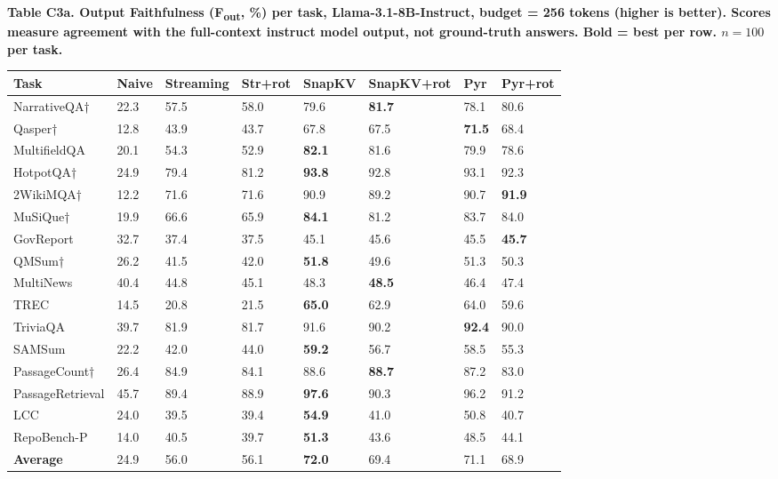 \documentclass[10pt,letterpaper]{article}
\begin{document}
\textbf{Table C3a. Output Faithfulness (F\textsubscript{out}, \%) per task, Llama-3.1-8B-Instruct,
budget = 256 tokens (higher is better). Scores measure agreement with the full-context
instruct model output, not ground-truth answers. Bold = best per row.
$n = 100$ per task.}

\nopagebreak
\begin{table}[H]
\centering
\small
\begin{tabular}{@{}llllllll@{}}
\toprule
Task & Naive & Streaming & Str+rot & SnapKV & SnapKV+rot & Pyr &
Pyr+rot\\
\midrule
NarrativeQA† & 22.3 & 57.5 & 58.0 & 79.6 & \textbf{81.7} & 78.1 &
80.6\\
Qasper† & 12.8 & 43.9 & 43.7 & 67.8 & 67.5 & \textbf{71.5} &
68.4\\
MultifieldQA & 20.1 & 54.3 & 52.9 & \textbf{82.1} & 81.6 & 79.9 &
78.6\\
HotpotQA† & 24.9 & 79.4 & 81.2 & \textbf{93.8} & 92.8 & 93.1 &
92.3\\
2WikiMQA† & 12.2 & 71.6 & 71.6 & 90.9 & 89.2 & 90.7 &
\textbf{91.9}\\
MuSiQue† & 19.9 & 66.6 & 65.9 & \textbf{84.1} & 81.2 & 83.7 &
84.0\\
GovReport & 32.7 & 37.4 & 37.5 & 45.1 & 45.6 & 45.5 &
\textbf{45.7}\\
QMSum† & 26.2 & 41.5 & 42.0 & \textbf{51.8} & 49.6 & 51.3 &
50.3\\
MultiNews & 40.4 & 44.8 & 45.1 & 48.3 & \textbf{48.5} & 46.4 &
47.4\\
TREC & 14.5 & 20.8 & 21.5 & \textbf{65.0} & 62.9 & 64.0 &
59.6\\
TriviaQA & 39.7 & 81.9 & 81.7 & 91.6 & 90.2 & \textbf{92.4} &
90.0\\
SAMSum & 22.2 & 42.0 & 44.0 & \textbf{59.2} & 56.7 & 58.5 &
55.3\\
PassageCount† & 26.4 & 84.9 & 84.1 & 88.6 & \textbf{88.7} & 87.2 &
83.0\\
PassageRetrieval & 45.7 & 89.4 & 88.9 & \textbf{97.6} & 90.3 & 96.2 &
91.2\\
LCC & 24.0 & 39.5 & 39.4 & \textbf{54.9} & 41.0 & 50.8 &
40.7\\
RepoBench-P & 14.0 & 40.5 & 39.7 & \textbf{51.3} & 43.6 & 48.5 &
44.1\\
\textbf{Average} & 24.9 & 56.0 & 56.1 & \textbf{72.0} & 69.4 & 71.1 &
68.9\\
\bottomrule
\end{tabular}
\end{table}
\end{document}
